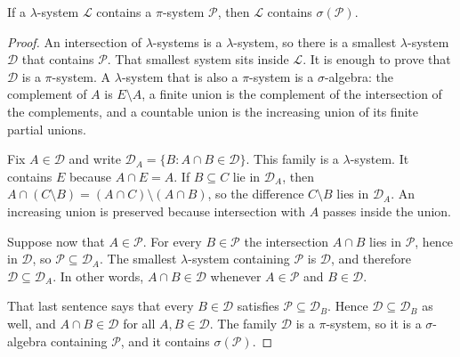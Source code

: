 \begin{theorem}\label{thm:dynkin6}
If a $\lambda$-system $\mathcal L$ contains a $\pi$-system $\mathcal P$, then $\mathcal L$ contains $\sigma(\mathcal P)$.
\end{theorem}
\begin{proof}
An intersection of $\lambda$-systems is a $\lambda$-system, so there is a smallest $\lambda$-system $\mathcal D$ that contains $\mathcal P$.
That smallest system sits inside $\mathcal L$.
It is enough to prove that $\mathcal D$ is a $\pi$-system.
A $\lambda$-system that is also a $\pi$-system is a $\sigma$-algebra: the complement of $A$ is $E\setminus A$, a finite union is the complement of the intersection of the complements, and a countable union is the increasing union of its finite partial unions.

Fix $A\in\mathcal D$ and write $\mathcal D_A=\{B:A\cap B\in\mathcal D\}$.
This family is a $\lambda$-system.
It contains $E$ because $A\cap E=A$.
If $B\subseteq C$ lie in $\mathcal D_A$, then $A\cap(C\setminus B)=(A\cap C)\setminus(A\cap B)$, so the difference $C\setminus B$ lies in $\mathcal D_A$.
An increasing union is preserved because intersection with $A$ passes inside the union.

Suppose now that $A\in\mathcal P$.
For every $B\in\mathcal P$ the intersection $A\cap B$ lies in $\mathcal P$, hence in $\mathcal D$, so $\mathcal P\subseteq\mathcal D_A$.
The smallest $\lambda$-system containing $\mathcal P$ is $\mathcal D$, and therefore $\mathcal D\subseteq\mathcal D_A$.
In other words, $A\cap B\in\mathcal D$ whenever $A\in\mathcal P$ and $B\in\mathcal D$.

That last sentence says that every $B\in\mathcal D$ satisfies $\mathcal P\subseteq\mathcal D_B$.
Hence $\mathcal D\subseteq\mathcal D_B$ as well, and $A\cap B\in\mathcal D$ for all $A,B\in\mathcal D$.
The family $\mathcal D$ is a $\pi$-system, so it is a $\sigma$-algebra containing $\mathcal P$, and it contains $\sigma(\mathcal P)$.
\end{proof}

